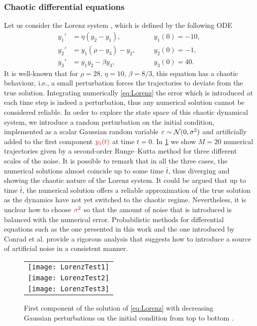 \documentclass[10pt]{article}
\begin{document}
\subsubsection*{Chaotic differential equations} Let us consider the Lorenz system \cite{Lor63}, which is defined by the following ODE
\begin{equation}\label{eq:Lorenz}
\begin{aligned}
	y_1' &= \eta(y_2 - y_1), \quad &&y_1(0) = -10,\\
	y_2' &= y_1(\rho - y_3) - y_2, \quad &&y_2(0) = -1,\\
	y_3' &= y_1y_2 - \beta y_3, \quad &&y_3(0) = 40.
\end{aligned}
\end{equation}
It is well-known that for $\rho=28$, $\eta=10$, $\beta=8/3$, this equation has a chaotic behaviour, i.e., a small perturbation forces the trajectories to deviate from the true solution. Integrating numerically \eqref{eq:Lorenz} the error which is introduced at each time step is indeed a perturbation, thus any numerical solution cannot be considered reliable. In order to explore the state space of this chaotic dynamical system, we introduce a random perturbation on the initial condition, implemented as a scalar Gaussian random variable $\varepsilon \sim \mathcal{N}(0, \sigma^2)$ and artificially added to the first component ${\color{red}y_1(t)}$ at time $t = 0$. In \cref{fig:LorenzTest} we show $M = 20$ numerical trajectories given by a second-order Runge--Kutta method for three different scales of the noise. It is possible to remark that in all the three cases, the numerical solutions almost coincide up to some time $\bar t$, thus diverging and showing the chaotic nature of the Lorenz system. It could be argued that up to time $\bar t$, the numerical solution offers a reliable approximation of the true solution as the dynamics have not yet switched to the chaotic regime. Nevertheless, it is unclear how to choose ${\color{red}\sigma^2}$ so that the amount of noise that is introduced is balanced with the numerical error. Probabilistic methods for differential equations such as the one presented in this work and the one introduced by Conrad et al. \cite{CGS17} provide a rigorous analysis that suggests how to introduce a source of artificial noise in a consistent manner.
 
\begin{figure}
	\begin{center}
		\begin{tabular}{c}
			\texttt{[image: LorenzTest1]} \\
			\texttt{[image: LorenzTest2]} \\
			\texttt{[image: LorenzTest3]}
		\end{tabular}
	\end{center}
	\caption{First component  of the solution of \eqref{eq:Lorenz} with decreasing Gaussian perturbations on the initial condition from top to bottom .}
	\label{fig:LorenzTest}
\end{figure}
\end{document}
